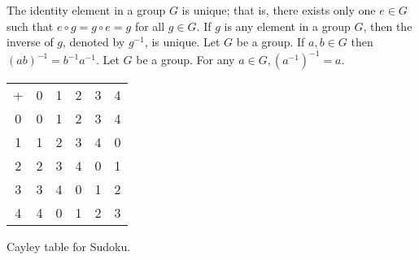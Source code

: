 \documentclass[11pt]{article} %
\begin{document}
{The identity element in a group $G$ is unique; that is, there exists only one $e \in G$ such that $e \circ g = g \circ e = g$ for all $g \in G$.}
{}
{If $g$ is any element in a group $G$, then the inverse of $g$, denoted by $g^{-1}$, is unique.}
{}
{Let $G$ be a group. If $a, b \in G$ then $(ab)^{-1} = b^{-1} a^{-1}$.}
{}
{Let $G$ be a group. For any $a \in G, (a^{-1})^{-1} = a$.}
{}


\begin{center}
\noindent\begin{tabular}{c | c c c c c}
    + & 0 & 1 & 2 & 3 & 4  \\
    \cline{1-6}
    0 & 0 & 1 & 2 & 3 & 4 \\
    1 & 1 & 2 & 3 & 4 & 0 \\
    2 & 2 & 3 & 4 & 0 & 1 \\
    3 & 3 & 4 & 0 & 1 & 2 \\
    4 & 4 & 0 & 1 & 2 & 3 \\
\end{tabular}

\vspace{10pt}
Cayley table for Sudoku.
\end{center}
\end{document}
